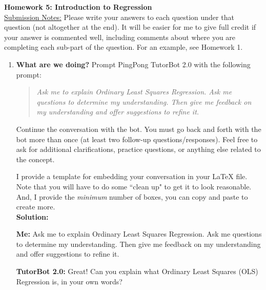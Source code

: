 \documentclass{article}\usepackage[]{graphicx}\usepackage[]{xcolor}
\begin{document}
\noindent\textbf{Homework 5: Introduction to Regression}\\
\noindent\makebox[\linewidth]{\rule{\textwidth}{0.4pt}}
\noindent\underline{Submission Notes:} Please write your answers to each 
question under that question (not altogether at the end). It will be easier for 
me to give full credit if your answer is commented well, including comments 
about where you are completing each sub-part of the question. For an example,
see Homework 1.\\
\noindent\makebox[\linewidth]{\rule{\textwidth}{0.4pt}}


\begin{enumerate}
  \item \textbf{What are we doing?} Prompt PingPong TutorBot 2.0 with the 
  following prompt:
  \begin{quote}
    \textit{Ask me to explain Ordinary Least Squares Regression. Ask me 
    questions to determine my understanding. Then give me feedback on my 
    understanding and offer suggestions to refine it.}
  \end{quote}
  Continue the conversation with the bot. You must go back and forth with the 
  bot more than once (at least two follow-up questions/responses). Feel free to
  ask for additional clarifications, practice questions, or anything else 
  related to the concept.
  
  I provide a template for embedding your conversation in your LaTeX file. Note
  that you will have to do some ``clean up" to get it to look reasonable. And,
  I provide the \textit{minimum} number of boxes, you can copy and paste
  to create more.\\
  \textbf{Solution:}
  \begin{tcolorbox}[breakable]
    \textbf{Me:} Ask me to explain Ordinary Least Squares Regression. Ask me 
    questions to determine my understanding. Then give me feedback on my 
    understanding and offer suggestions to refine it.
  \end{tcolorbox}
  \begin{tcolorbox}[breakable]
    \textbf{TutorBot 2.0:} Great! Can you explain what Ordinary Least Squares (OLS) Regression is, in your own words?


\end{tcolorbox}
\end{enumerate}
\end{document}
